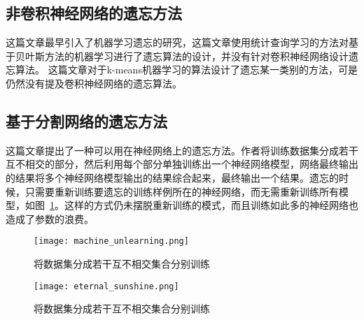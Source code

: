 \subsection{非卷积神经网络的遗忘方法}
这篇文章\cite{yinzhicao2015}最早引入了机器学习遗忘的研究，这篇文章使用统计查询学习的方法对基于贝叶斯方法的机器学习进行了遗忘算法的设计，并没有针对卷积神经网络设计遗忘算法。
这篇文章\cite{antonio2019}对于k-means机器学习的算法设计了遗忘某一类别的方法，可是仍然没有提及卷积神经网络的遗忘算法。
\subsection{基于分割网络的遗忘方法}
这篇文章\cite{2019arXiv191203817B}提出了一种可以用在神经网络上的遗忘方法。作者将训练数据集分成若干互不相交的部分，然后利用每个部分单独训练出一个神经网络模型，网络最终输出的结果将多个神经网络模型输出的结果综合起来，最终输出一个结果。遗忘的时候，只需要重新训练要遗忘的训练样例所在的神经网络，而无需重新训练所有模型，如图~\ref{fig:machine_unlearning}。这样的方式仍未摆脱重新训练的模式，而且训练如此多的神经网络也造成了参数的浪费。
\begin{figure}
    \centering
    \texttt{[image: machine\_unlearning.png]}
    \caption{将数据集分成若干互不相交集合分别训练}
    \label{fig:machine_unlearning}
\end{figure}
\begin{figure}
    \centering
    \texttt{[image: eternal\_sunshine.png]}
    \caption{将数据集分成若干互不相交集合分别训练}
    \label{fig:eternal_sunshine}
\end{figure}
